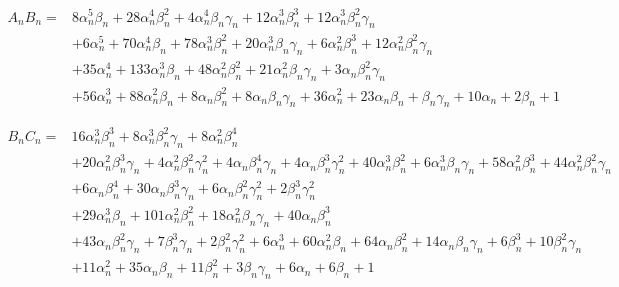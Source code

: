 \begin{align*}
A_nB_n =& 8 \alpha_n^{5} \beta_n + 28 \alpha_n^{4} \beta_n^{2} + 4 \alpha_n^{4} \beta_n \gamma_n + 12 \alpha_n^{3} \beta_n^{3} + 12 \alpha_n^{3} \beta_n^{2} \gamma_n \\
 &+ 6 \alpha_n^{5} + 70 \alpha_n^{4} \beta_n + 78 \alpha_n^{3} \beta_n^{2} + 20 \alpha_n^{3} \beta_n \gamma_n + 6 \alpha_n^{2} \beta_n^{3} + 12 \alpha_n^{2} \beta_n^{2} \gamma_n \\
 &+ 35 \alpha_n^{4} + 133 \alpha_n^{3} \beta_n + 48 \alpha_n^{2} \beta_n^{2} + 21 \alpha_n^{2} \beta_n \gamma_n + 3 \alpha_n \beta_n^{2} \gamma_n \\
 &+ 56 \alpha_n^{3} + 88 \alpha_n^{2} \beta_n + 8 \alpha_n \beta_n^{2} + 8 \alpha_n \beta_n \gamma_n + 36 \alpha_n^{2} + 23 \alpha_n \beta_n + \beta_n \gamma_n + 10 \alpha_n + 2 \beta_n + 1 
\end{align*}

\begin{align*}
B_nC_n =& 16 \alpha_n^{3} \beta_n^{3} + 8 \alpha_n^{3} \beta_n^{2} \gamma_n + 8 \alpha_n^{2} \beta_n^{4} \\
&+ 20 \alpha_n^{2} \beta_n^{3} \gamma_n + 4 \alpha_n^{2} \beta_n^{2} \gamma_n^{2} + 4 \alpha_n \beta_n^{4} \gamma_n + 4 \alpha_n \beta_n^{3} \gamma_n^{2} + 40 \alpha_n^{3} \beta_n^{2} + 6 \alpha_n^{3} \beta_n \gamma_n + 58 \alpha_n^{2} \beta_n^{3} + 44 \alpha_n^{2} \beta_n^{2} \gamma_n\\
&+ 6 \alpha_n \beta_n^{4} + 30 \alpha_n \beta_n^{3} \gamma_n + 6 \alpha_n \beta_n^{2} \gamma_n^{2} + 2 \beta_n^{3} \gamma_n^{2} \\
&+ 29 \alpha_n^{3} \beta_n + 101 \alpha_n^{2} \beta_n^{2} + 18 \alpha_n^{2} \beta_n \gamma_n + 40 \alpha_n \beta_n^{3} \\
&+ 43 \alpha_n \beta_n^{2} \gamma_n + 7 \beta_n^{3} \gamma_n + 2 \beta_n^{2} \gamma_n^{2} + 6 \alpha_n^{3} + 60 \alpha_n^{2} \beta_n + 64 \alpha_n \beta_n^{2} + 14 \alpha_n \beta_n \gamma_n + 6 \beta_n^{3} + 10 \beta_n^{2} \gamma_n \\
&+ 11 \alpha_n^{2} + 35 \alpha_n \beta_n + 11 \beta_n^{2} + 3 \beta_n \gamma_n + 6 \alpha_n + 6 \beta_n + 1
\end{align*}



